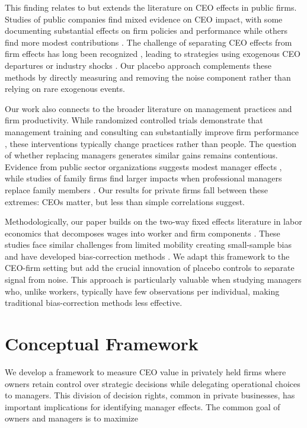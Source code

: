 \documentclass[11pt,a4paper]{article}
\begin{document}
This finding relates to but extends the literature on CEO effects in public firms. Studies of public companies find mixed evidence on CEO impact, with some documenting substantial effects on firm policies and performance \citep{Bertrand2003-io, bennedsen2020ceos} while others find more modest contributions \citep{fee2013managers}. The challenge of separating CEO effects from firm effects has long been recognized \citep{Bertrand2003-io}, leading to strategies using exogenous CEO departures \citep{bennedsen2020ceos} or industry shocks \citep{metcalfe2023managers}. Our placebo approach complements these methods by directly measuring and removing the noise component rather than relying on rare exogenous events.

Our work also connects to the broader literature on management practices and firm productivity. While randomized controlled trials demonstrate that management training and consulting can substantially improve firm performance \citep{bloom2013does}, these interventions typically change practices rather than people. The question of whether replacing managers generates similar gains remains contentious. Evidence from public sector organizations suggests modest manager effects \citep{fenizia2022managers, janke2024role}, while studies of family firms find larger impacts when professional managers replace family members \citep{bennedsen2007inside}. Our results for private firms fall between these extremes: CEOs matter, but less than simple correlations suggest.

Methodologically, our paper builds on the two-way fixed effects literature in labor economics that decomposes wages into worker and firm components \citep{Abowd1999Econometrica, Card2018JoLE}. These studies face similar challenges from limited mobility creating small-sample bias \citep{andrews2008high} and have developed bias-correction methods \citep{Bonhomme2023-dx, gaure2014correlation}. We adapt this framework to the CEO-firm setting but add the crucial innovation of placebo controls to separate signal from noise. This approach is particularly valuable when studying managers who, unlike workers, typically have few observations per individual, making traditional bias-correction methods less effective.

\section{Conceptual Framework}

We develop a framework to measure CEO value in privately held firms where owners retain control over strategic decisions while delegating operational choices to managers. This division of decision rights, common in private businesses, has important implications for identifying manager effects. The common goal of owners and managers is to maximize 
\end{document}
